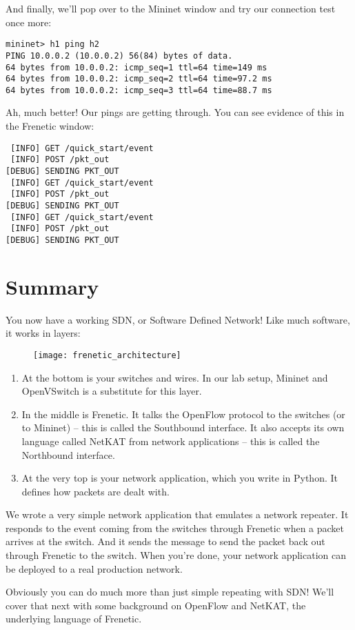 And finally, we'll pop over to the Mininet window and try our connection test once more:

\begin{verbatim}
mininet> h1 ping h2
PING 10.0.0.2 (10.0.0.2) 56(84) bytes of data.
64 bytes from 10.0.0.2: icmp_seq=1 ttl=64 time=149 ms
64 bytes from 10.0.0.2: icmp_seq=2 ttl=64 time=97.2 ms
64 bytes from 10.0.0.2: icmp_seq=3 ttl=64 time=88.7 ms
\end{verbatim}

Ah, much better! 
Our pings are getting through.  
You can see evidence of this in the Frenetic window:

\begin{verbatim}
 [INFO] GET /quick_start/event
 [INFO] POST /pkt_out
[DEBUG] SENDING PKT_OUT
 [INFO] GET /quick_start/event
 [INFO] POST /pkt_out
[DEBUG] SENDING PKT_OUT
 [INFO] GET /quick_start/event
 [INFO] POST /pkt_out
[DEBUG] SENDING PKT_OUT
\end{verbatim}

\section{Summary}

You now have a working SDN, or Software Defined Network!   Like much software, it works in layers:

\begin{figure}[h]
\centering
\texttt{[image: frenetic\_architecture]}
\end{figure}

\begin{enumerate}
\item At the bottom is your switches and wires.  In our lab setup, Mininet and OpenVSwitch is a substitute for this layer.
\item In the middle is Frenetic.  It talks the OpenFlow protocol to the switches (or to Mininet) -- this is called the Southbound interface.  It also accepts its own language called NetKAT from network applications -- this is called the Northbound interface.
\item At the very top is your network application, which you write in Python.  It defines how packets are dealt with.
\end{enumerate}

We wrote a very simple network application that emulates a network repeater.   
It responds to the  event coming from the switches through Frenetic when a packet 
arrives at the switch.  
And it sends the  message to send the packet back out through Frenetic to the switch.  
When you're done, your network application can be deployed to a real production network.

Obviously you can do much more than just simple repeating with SDN!  
We'll cover that next with some background on OpenFlow and NetKAT, the underlying language of Frenetic. 